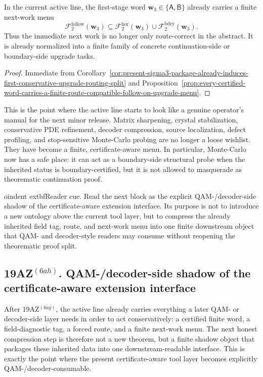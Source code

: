 \begin{corollary}
\label{cor:present-sigma3-package-already-carries-a-finite-next-work-menu}
In the current active line, the first-stage word \(\mathbf w_3\in\{\mathsf A,\mathsf B\}\) already carries a finite next-work menu
\[
 \mathcal F^{\mathrm{follow}}_{2}(\mathbf w_3)
 \subseteq
 \mathcal F^{\mathrm{hor}}_{2}(\mathbf w_3)\cup \mathcal F^{\mathrm{bdry}}_{2}(\mathbf w_3).
\]
Thus the immediate next work is no longer only route-correct in the abstract. It is already normalized into a finite family of concrete continuation-side or boundary-side upgrade tasks.
\end{corollary}

\begin{proof}
Immediate from Corollary~\ref{cor:present-sigma3-package-already-induces-first-conservative-upgrade-routing-split} and Proposition~\ref{prop:every-certified-word-carries-a-finite-route-compatible-follow-on-upgrade-menu}.
\end{proof}

\begin{remark}
\label{rem:what-this-finite-next-work-menu-now-buys}
This is the point where the active line starts to look like a genuine operator's manual for the next minor release. Matrix sharpening, crystal stabilization, conservative PDE refinement, decoder compression, source localization, defect profiling, and stop-sensitive Monte-Carlo probing are no longer a loose wishlist. They have become a finite, certificate-aware menu. In particular, Monte-Carlo now has a safe place: it can act as a boundary-side structural probe when the inherited status is boundary-certified, but it is not allowed to masquerade as theorematic continuation proof.
\end{remark}




oindent	extbf{Reader cue.} Read the next block as the explicit QAM-/decoder-side shadow of the certificate-aware extension interface. Its purpose is not to introduce a new ontology above the current tool layer, but to compress the already inherited field tag, route, and next-work menu into one finite downstream object that QAM- and decoder-style readers may consume without reopening the theorematic proof split.

\subsection*{19AZ$^{(6ah)}$. QAM-/decoder-side shadow of the certificate-aware extension interface}
\label{sec:qam-decoder-side-shadow-of-the-certificate-aware-extension-interface}
After 19AZ$^{(6ag)}$, the active line already carries everything a later QAM- or decoder-side layer needs in order to act conservatively: a certified finite word, a field-diagnostic tag, a forced route, and a finite next-work menu. The next honest compression step is therefore not a new theorem, but a finite shadow object that packages these inherited data into one downstream-readable interface. This is exactly the point where the present certificate-aware tool layer becomes explicitly QAM-/decoder-consumable.

